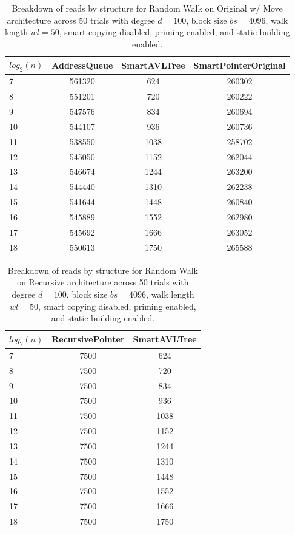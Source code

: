 \begin{table}[]
\centering
\begin{tabular}{|l|c|c|c|}
$log_2(n)$ & AddressQueue & SmartAVLTree & SmartPointerOriginal \\ \hline
7 & 561320 & 624 & 260302 \\ \hline
8 & 551201 & 720 & 260222 \\ \hline
9 & 547576 & 834 & 260694 \\ \hline
10 & 544107 & 936 & 260736 \\ \hline
11 & 538550 & 1038 & 258702 \\ \hline
12 & 545050 & 1152 & 262044 \\ \hline
13 & 546674 & 1244 & 263200 \\ \hline
14 & 544440 & 1310 & 262238 \\ \hline
15 & 541644 & 1448 & 260840 \\ \hline
16 & 545889 & 1552 & 262980 \\ \hline
17 & 545692 & 1666 & 263052 \\ \hline
18 & 550613 & 1750 & 265588 \\ \hline
\end{tabular}
\caption{Breakdown of reads by structure for Random Walk on Original w/ Move architecture across 50 trials with degree $d=100$, block size $bs=4096$, walk length $wl=50$, smart copying disabled, priming enabled, and static building enabled.}
    \label{tab:reads_by_structure_rw_d100_bs4096_trials50_copiesfalse_primetrue_staticinsertiontrue_wl50_ptoriginal_movetrue}
\end{table}

\begin{table}[]
\centering
\begin{tabular}{|l|c|c|}
$log_2(n)$ & RecursivePointer & SmartAVLTree \\ \hline
7 & 7500 & 624 \\ \hline
8 & 7500 & 720 \\ \hline
9 & 7500 & 834 \\ \hline
10 & 7500 & 936 \\ \hline
11 & 7500 & 1038 \\ \hline
12 & 7500 & 1152 \\ \hline
13 & 7500 & 1244 \\ \hline
14 & 7500 & 1310 \\ \hline
15 & 7500 & 1448 \\ \hline
16 & 7500 & 1552 \\ \hline
17 & 7500 & 1666 \\ \hline
18 & 7500 & 1750 \\ \hline
\end{tabular}
\caption{Breakdown of reads by structure for Random Walk on Recursive architecture across 50 trials with degree $d=100$, block size $bs=4096$, walk length $wl=50$, smart copying disabled, priming enabled, and static building enabled.}
    \label{tab:reads_by_structure_rw_d100_bs4096_trials50_copiesfalse_primetrue_staticinsertiontrue_wl50_ptrecursive_movetrue}
\end{table}

